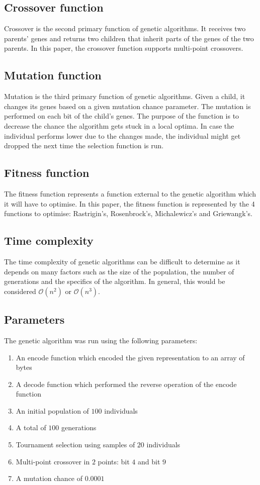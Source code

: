 \documentclass[conference]{IEEEtran}
\begin{document}
\subsection{Crossover function}
Crossover is the second primary function of genetic algorithms. It receives two parents' genes and returns two children that
inherit parts of the genes of the two parents. In this paper, the crossover function supports multi-point crossovers.

\subsection{Mutation function}
Mutation is the third primary function of genetic algorithms. Given a child, it changes its genes based on a given mutation chance
parameter. The mutation is performed on each bit of the child's genes. The purpose of the function is to decrease the chance
the algorithm gets stuck in a local optima. In case the individual performs lower due to the changes made, the individual might
get dropped the next time the selection function is run.

\subsection{Fitness function}
The fitness function represents a function external to the genetic algorithm which it will have to optimise. In this paper, the fitness
function is represented by the 4 functions to optimise: Rastrigin's, Rosenbrock's, Michalewicz's and Griewangk's.

\subsection{Time complexity}
The time complexity of genetic algorithms can be difficult to determine as it depends on many factors such as the size of the population,
the number of generations and the specifics of the algorithm. In general, this would be considered $\mathcal{O}(n^2)$ or $\mathcal{O}(n^3)$.

\subsection{Parameters}
The genetic algorithm was run using the following parameters:

\begin{enumerate}
    \item An encode function which encoded the given representation to an array of bytes
    \item A decode function which performed the reverse operation of the encode function
    \item An initial population of $100$ individuals
    \item A total of $100$ generations
    \item Tournament selection using samples of $20$ individuals
    \item Multi-point crossover in $2$ points: bit $4$ and bit $9$
    \item A mutation chance of $0.0001$
\end{enumerate}
\end{document}
